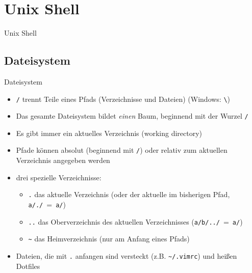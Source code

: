 \section{Unix Shell}
  \begin{frame}{Unix Shell}
    \tableofcontents[sectionstyle=show/hide,
                     hideothersubsections]
  \end{frame}

  \subsection{Dateisystem}
    \begin{frame}{Dateisystem}
      \begin{itemize}
        \item \texttt{/} trennt Teile eines Pfads (Verzeichnisse und Dateien) (Windows: \texttt{\textbackslash})
        \item Das gesamte Dateisystem bildet \emph{einen} Baum, beginnend mit der Wurzel \texttt{/}
        \item Es gibt immer ein aktuelles Verzeichnis (working directory)
        \item Pfade können absolut (beginnend mit \texttt{/}) oder relativ zum aktuellen Verzeichnis angegeben werden
        \item drei spezielle Verzeichnisse:
          \begin{itemize}
            \item \texttt{.} das aktuelle Verzeichnis (oder der aktuelle im bisherigen Pfad, \texttt{a/./}~=~\texttt{a/})
            \item \texttt{..} das Oberverzeichnis des aktuellen Verzeichnisses (\texttt{a/b/../}~=~\texttt{a/})
            \item \texttt{\textasciitilde} das Heimverzeichnis (nur am Anfang eines Pfads)
          \end{itemize}
        \item Dateien, die mit \texttt{.} anfangen sind versteckt (z.B. \texttt{\textasciitilde/.vimrc}) und heißen Dotfiles
      \end{itemize}
    \end{frame}

